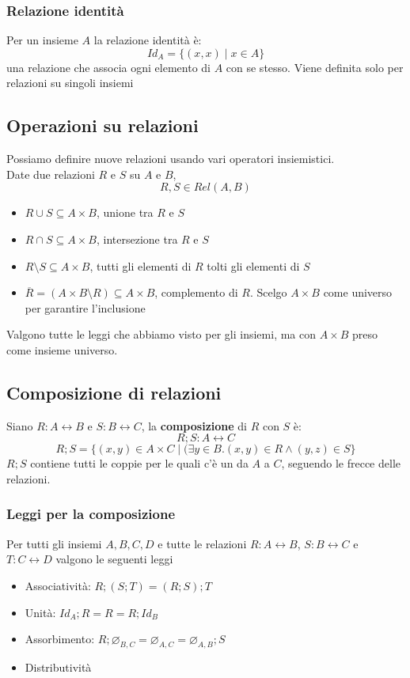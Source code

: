 \documentclass{article}
\begin{document}
\subsubsection{Relazione identità}
Per un insieme \(A\) la relazione identità è:
\[Id_A = \{(x,x) \mid x \in A\}\]
una relazione che associa ogni elemento di \(A\) con se stesso. Viene definita solo per relazioni su singoli insiemi

\subsection{Operazioni su relazioni}
Possiamo definire nuove relazioni usando vari operatori insiemistici.\\
Date due relazioni \(R\) e \(S\) su \(A\) e \(B\),
\[R, S \in Rel(A,B)\]
\begin{itemize}
    \item \(R \cup S \subseteq A \times B\), unione tra \(R\) e \(S\)
    \item \(R \cap S \subseteq A \times B\), intersezione tra \(R\) e \(S\)
    \item \(R \setminus S \subseteq A \times B\), tutti gli elementi di \(R\) tolti gli elementi di \(S\)
    \item \(\overline{R} = (A \times B \setminus R) \subseteq A \times B\), complemento di \(R\). Scelgo \(A \times B\) come universo per garantire l'inclusione
\end{itemize}
Valgono tutte le leggi che abbiamo visto per gli insiemi, ma con \(A \times B\) preso come insieme universo.

\subsection{Composizione di relazioni}
Siano \(R: A \leftrightarrow B\) e \(S: B \leftrightarrow C\), la \textbf{composizione} di \(R\) con \(S\) è:
\[R;S: A \leftrightarrow C\]
\[R;S = \{(x,y) \in A \times C \mid (\exists y \in B . (x,y) \in R \land (y,z) \in S\}\]
\(R;S\) contiene tutti le coppie per le quali c'è un  da \(A\) a \(C\), seguendo le frecce delle relazioni.

\subsubsection{Leggi per la composizione}
Per tutti gli insiemi \(A,B,C,D\) e tutte le relazioni \(R: A \leftrightarrow B\), \(S: B \leftrightarrow C\) e \(T: C \leftrightarrow D\) valgono le seguenti leggi
\begin{itemize}
    \item Associatività: \(R;(S;T) = (R;S);T\)
    \item Unità: \(Id_A;R = R = R;Id_B\)
    \item Assorbimento: \(R;\varnothing_{B,C} = \varnothing_{A,C} = \varnothing_{A,B};S\)
    \item Distributività
\end{itemize}
\end{document}

